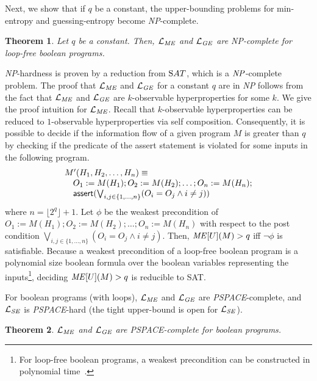 \documentclass[]{eptcs}
\newcommand{\aset}[1]{\{{#1}\}}
\newtheorem{theorem}{Theorem}[section]
\begin{document}
Next, we show that if $q$ be a constant, the upper-bounding problems
for min-entropy and guessing-entropy become {\it NP}-complete.
\begin{theorem}
\label{thm:lmelgenp}
  Let $q$ be a constant.  Then, $\mathcal{L}_{\it ME}$ and
  $\mathcal{L}_{\it GE}$ are {\it NP}-complete for loop-free boolean
  programs.
\end{theorem} 
{\it NP}-hardness is proven by a reduction from ${\text SAT}$, which
is a ${\it NP}$-complete problem.  The proof that $\mathcal{L}_{\it
  ME}$ and $\mathcal{L}_{\it GE}$ for a constant $q$ are in {\it NP}
follows from the fact that $\mathcal{L}_{\it ME}$ and
$\mathcal{L}_{\it GE}$ are $k$-observable hyperproperties for some
$k$.  We give the proof intuition for $\mathcal{L}_{\it ME}$.  Recall
that $k$-observable hyperproperties can be reduced to $1$-observable
hyperproperties via self composition.  Consequently, it is possible to
decide if the information flow of a given program $M$ is greater than
$q$ by checking if the predicate of the {\sf assert} statement is
violated for some inputs in the following program.
\[
\begin{array}{l}
  M'(H_1,H_2,\dots,H_n)\equiv\\
  \quad O_1:=M(H_1);O_2:=M(H_2);\dots;O_n:=M(H_n);\\
  \quad {\sf assert}(\bigvee_{i,j\in\aset{1,\dots,n}}(O_i=O_j\wedge i\not=j))
\end{array}
\]
where $n=\lfloor 2^q\rfloor +1$.  Let $\phi$ be the weakest
precondition of $O_1:=M(H_1);O_2:=M(H_2);\dots;O_n:=M(H_n)$ with
respect to the post condition
$\bigvee_{i,j\in\aset{1,\dots,n}}(O_i=O_j\wedge i\not=j)$.  Then,
${\it ME}[U](M)>q$ iff $\neg \phi$ is satisfiable.  Because a weakest
precondition of a loop-free boolean program is a polynomial size
boolean formula over the boolean variables representing the
inputs\footnote{For loop-free boolean programs, a weakest precondition
  can be constructed in polynomial
  time~\cite{DBLP:conf/popl/FlanaganS01,DBLP:journals/ipl/Leino05}.},
deciding ${\it ME}[U](M)>q$ is reducible to {\text SAT}.

For boolean programs (with loops), $\mathcal{L}_{\it ME}$ and
$\mathcal{L}_{\it GE}$ are {\it PSPACE}-complete, and
$\mathcal{L}_{\it SE}$ is {\it PSPACE}-hard (the tight upper-bound is
open for $\mathcal{L}_{\it SE}$).
\begin{theorem}
\label{thm:lmelgepspace}
  $\mathcal{L}_{\it ME}$ and $\mathcal{L}_{\it GE}$ are {\it
    PSPACE}-complete for boolean programs.
\end{theorem}
\end{document}

